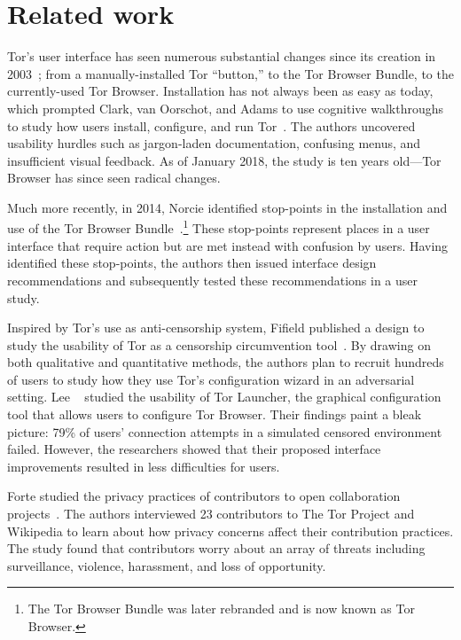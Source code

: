 \section{Related work}
\label{sec:related-work}

Tor's user interface has seen numerous substantial changes since its creation in
2003~\cite{Syverson2005a}; from a manually-installed Tor ``button,'' to the Tor
Browser Bundle, to the currently-used Tor Browser.  Installation has not always
been as easy as today, which prompted Clark, van Oorschot, and Adams to use
cognitive walkthroughs to study how users install, configure, and run
Tor~\cite{Clark2007a}.  The authors uncovered usability hurdles such as
jargon-laden documentation, confusing menus, and insufficient visual feedback.
As of January 2018, the study is ten years old---Tor Browser has since seen
radical changes.

Much more recently, in 2014, Norcie \ea identified stop-points in the
installation and use of the Tor Browser Bundle~\cite{Norcie2014a}.\footnote{The
Tor Browser Bundle was later rebranded and is now known as Tor Browser.}  These
stop-points represent places in a user interface that require action but are met
instead with confusion by users.  Having identified these stop-points, the
authors then issued interface design recommendations and subsequently tested
these recommendations in a user study.

Inspired by Tor's use as anti-censorship system, Fifield \ea published a design
to study the usability of Tor as a censorship circumvention
tool~\cite{Fifield2015a}.  By drawing on both qualitative and quantitative
methods, the authors plan to recruit hundreds of users to study how they use
Tor's configuration wizard in an adversarial setting.  Lee \ea~\cite{Lee2017a}
studied the usability of Tor Launcher, the graphical configuration tool that
allows users to configure Tor Browser.  Their findings paint a bleak picture:
79\% of users' connection attempts in a simulated censored environment failed.
However, the researchers showed that their proposed interface improvements
resulted in less difficulties for users.

Forte \ea studied the privacy practices of contributors to open collaboration
projects~\cite{Forte2017a}.  The authors interviewed 23 contributors to The Tor
Project and Wikipedia to learn about how privacy concerns affect their
contribution practices.  The study found that contributors worry about an array
of threats including surveillance, violence, harassment, and loss of
opportunity.

